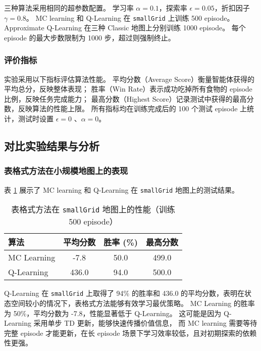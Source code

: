 三种算法采用相同的超参数配置。
学习率 $\alpha = 0.1$，探索率 $\epsilon = 0.05$，折扣因子 $\gamma = 0.8$。
MC learning 和 Q-Learning 在 \texttt{smallGrid} 上训练 500 episode。
Approximate Q-Learning 在三种 Classic 地图上分别训练 1000 episode。
每个 episode 的最大步数限制为 1000 步，超过则强制终止。

\subsubsection{评价指标}

实验采用以下指标评估算法性能。
平均分数（Average Score）衡量智能体获得的平均总分，反映整体表现；
胜率（Win Rate）表示成功吃掉所有食物的 episode 比例，反映任务完成能力；
最高分数（Highest Score）记录测试中获得的最高分数，反映算法的性能上限。
所有指标均在训练完成后的 100 个测试 episode 上统计，测试时设置 $\epsilon = 0$ 、$\alpha = 0$。


\subsection{对比实验结果与分析}

\subsubsection{表格式方法在小规模地图上的表现}

表 \ref{tab:tabular_methods} 展示了 MC learning 和 Q-Learning 在 \texttt{smallGrid} 地图上的测试结果。

\begin{table}[h]
    \renewcommand{\arraystretch}{1.5}
    \setlength{\tabcolsep}{10pt}
    \centering
    \caption{表格式方法在 \texttt{smallGrid} 地图上的性能（训练 500 episode）}
    \small
    \begin{tabular}{lccc}
        \toprule
        \textbf{算法} & \textbf{平均分数} & \textbf{胜率 (\%)} & \textbf{最高分数} \\
        \midrule
        MC Learning & -7.8 & 50.0 & 499.0 \\
        Q-Learning & 436.0 & 94.0 & 500.0 \\
        \bottomrule
    \end{tabular}
    \label{tab:tabular_methods}
\end{table}

Q-Learning 在 \texttt{smallGrid} 上取得了 94\% 的胜率和 436.0 的平均分数，表明在状态空间较小的情况下，表格式方法能够有效学习最优策略。
MC Learning 的胜率为 50\%，平均分数为 -7.8，性能显著低于 Q-Learning。
这可能是因为 Q-Learning 采用单步 TD 更新，能够快速传播价值信息，
而 MC learning 需要等待完整 episode 才能更新，在长 episode 场景下学习效率较低，且对初期探索的依赖性更强。


